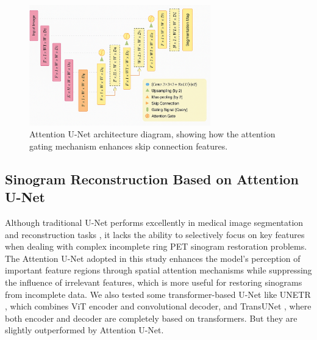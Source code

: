 \documentclass[
reprint,
superscriptaddress,
nofootinbib,
amsmath,amssymb,
aps,
prd,
]{revtex4-2}
\begin{document}

\begin{figure}[htbp]
    \centering
    \vspace{-.2cm}
    \includegraphics[width=0.7\textwidth]{Images/Unet.png}
    \vspace{-.3cm}
    \caption{Attention U-Net architecture diagram, showing how the attention gating mechanism enhances skip connection features.}
    \label{fig:unet_structure}
\end{figure}
\subsection{Sinogram Reconstruction Based on Attention U-Net}



Although traditional U-Net performs excellently in medical image segmentation and reconstruction tasks \cite{ronneberger2015unetconvolutionalnetworksbiomedical}, it lacks the ability to selectively focus on key features when dealing with complex incomplete ring PET sinogram restoration problems. The Attention U-Net \cite{oktay2018attentionunetlearninglook} adopted in this study enhances the model's perception of important feature regions through spatial attention mechanisms while suppressing the influence of irrelevant features, which is more useful for restoring sinograms from incomplete data. We also tested some transformer-based U-Net like UNETR \cite{hatamizadeh2021unetrtransformers3dmedical}, which combines ViT encoder and convolutional decoder, and TransUNet \cite{chen2021transunettransformersmakestrong}, where both encoder and decoder are completely based on transformers. But they are slightly outperformed by Attention U-Net.
\end{document}
